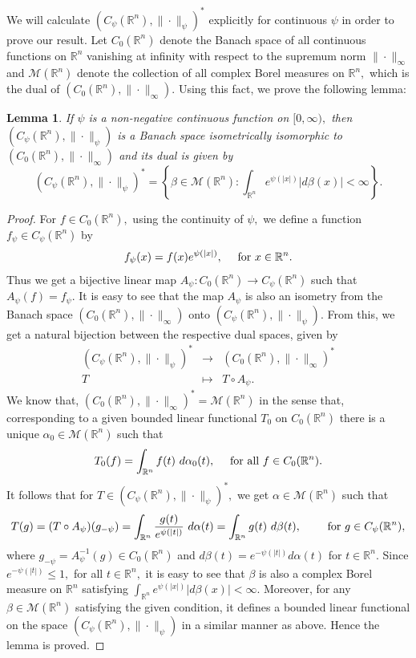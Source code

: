 \documentclass [11pt]{amsart}
\newtheorem{Lem}{Lemma}[section]
\newcommand{\R}{\mathbb R}
\newcommand{\txt} {\textmd}
\newcommand{\ds} {\displaystyle}
\newcommand{\bes} {\begin{equation*}}
\newcommand{\ees} {\end{equation*}}
\newcommand{\beas} {\begin{eqnarray*}}
\newcommand{\eeas} {\end{eqnarray*}}
\numberwithin{equation}{section}
\begin{document}
We will calculate $(C_{\psi}(\R^n),\|\cdot \|_{\psi})^*$ explicitly for continuous $\psi$ in order to prove our result. Let $C_0(\R^n)$ denote the Banach space of all continuous functions on $\R^n$ vanishing at infinity with respect to the supremum norm $\|\cdot\|_{\infty}$ and $\mathcal{M}(\R^n)$ denote the collection of all complex Borel measures on $ \R^n,$ which is the dual of $(C_0( \R^n),\|\cdot\|_{\infty}) .$ Using this fact, we prove the following lemma:
\begin{Lem}\label{dual lem}
If $\psi$ is a non-negative continuous function on $[0,\infty),$ then $(C_{\psi}( \R^n),\|\cdot\|_{\psi})$ is a Banach space isometrically isomorphic to $(C_0( \R^n),\|\cdot\|_{\infty})$ and its dual is given by
 $$(C_{\psi}( \R^n),\|\cdot\|_{\psi})^*=\left\lbrace\beta \in \mathcal{M}( \R^n) : 
 \int_{ \R^n}e^{\psi(|x|)}|d\beta(x)|<\infty \right\rbrace .$$
\end{Lem}
\begin{proof}
For $f \in C_0( \R^n),$ using the continuity of $\psi,$ we define a function $f_\psi \in C_{\psi}( \R^n)$ by 
\beas f_\psi(x)=f(x)e^{\psi(|x|)}, \quad \txt{ for } x \in  \R^n.\eeas
Thus we get a bijective linear map $A_\psi: C_0( \R^n) \to C_\psi( \R^n)$ such that $A_\psi(f) = f_\psi.$ It is easy to see that the map $A_\psi$ is also an isometry from the Banach space $(C_0( \R^n),\|\cdot\|_{\infty})$ onto $(C_{\psi}( \R^n),\|\cdot\|_{\psi}).$ From this, we get a natural bijection between the respective dual spaces, given by 
\beas 
(C_{\psi}( \R^n),\|\cdot\|_{\psi})^* &\to & (C_0( \R^n),\|\cdot\|_{\infty})^* \\
T & \mapsto & T \circ A_\psi.
\eeas
We know that, $(C_0( \R^n),\|\cdot\|_\infty)^*=\mathcal{M}( \R^n)$ in the sense that, corresponding to a given bounded linear functional $T_0$ on $C_0( \R^n)$ there is a unique $\alpha_0 \in \mathcal{M}( \R^n)$ such that 
\bes T_0(f)=\int_{ \R^n}f(t)~ d\alpha_0(t), \quad \txt{ for all } f\in C_0( \R^n).\ees
It follows that for $T\in (C_{\psi}( \R^n),\|\cdot\|_{\psi})^*,$ we get $\alpha \in \mathcal{M}( \R^n)$ such that 
\bes 
T(g) = (T \circ A_\psi)(g_{-\psi}) = \int_{ \R^n} \frac{g(t)}{e^{\psi(|t|)}}~ d\alpha(t)  =\int_{\R^n} g(t) ~ d\beta(t), 	\quad \quad \txt{ for } g\in C_\psi( \R^n),
\ees
where $g_{-\psi} = A_{\psi}^{-1}(g) \in C_0( \R^n)$ and $\ds{ d\beta(t) = e^{-\psi(|t|)} d \alpha(t)}$ for $t \in \R^n.$ Since $ e^{-\psi(|t|)} \leq 1,$ for all $t \in \R^n,$ it is easy to see that $\beta$ is also a complex Borel measure on $ \R^n$ satisfying $\ds{\int_{ \R^n}e^{\psi(|x|)}|d\beta(x)|<\infty.}$ Moreover, for any $\beta \in \mathcal{M}( \R^n)$ satisfying the given condition, it defines a bounded linear functional on the space $(C_\psi( \R^n), \|\cdot\|_{\psi})$ in a similar manner as above. Hence the lemma is proved.
\end{proof}
\end{document}
